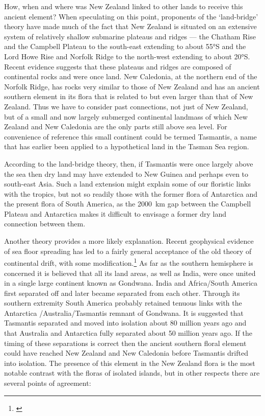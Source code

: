 How, when and where was New Zealand linked to other lands to receive this ancient element? When speculating on this point, proponents of the `land-bridge' theory have made much of the fact that New Zealand is situated on an extensive system of relatively shallow submarine plateaus and ridges --- the Chatham Rise and the Campbell Plateau to the south-east extending to about \ang{55}S and the Lord Howe Rise and Norfolk Ridge to the north-west extending to about \ang{20}S.
Recent evidence suggests that these plateaus and ridges are composed of continental rocks and were once land.
New Caledonia, at the northern end of the Norfolk Ridge, has rocks very similar to those of New Zealand and has an ancient southern element in its flora that is related to but even larger than that of New Zealand.
Thus we have to consider past connections, not just of New Zealand, but of a small and now largely submerged continental landmass of which New Zealand and New Caledonia are the only parts still above sea level.
For convenience of reference this small continent could be termed Tasmantis, a name that has earlier been applied to a hypothetical land in the Tasman Sea region.

According to the land-bridge theory, then, if Tasmantis were once largely above the sea then dry land may have extended to New Guinea and perhaps even to south-east Asia.
Such a land extension might explain some of our floristic links with the tropics, but not so readily those with the former flora of Antarctica and the present flora of South America, as the \SI{2000}{\kilo\metre} gap between the Campbell Plateau and Antarctica makes it difficult to envisage a former dry land connection between them.

Another theory provides a more likely explanation.
Recent geophysical evidence of sea floor spreading has led to a fairly general acceptance of the old theory of continental drift, with some modification.\footnote{\cite{stevens1980new}}
As far as the southern hemisphere is concerned it is believed that all its land areas, as well as India, were once united in a single large continent known as Gondwana.
India and Africa/South America first separated off and later became separated from each other.
Through its southern extremity South America probably retained tenuous links with the Antarctica /Australia/Tasmantis remnant of Gondwana.
It is suggested that Tasmantis separated and moved into isolation about 80 million years ago and that Australia and Antarctica fully separated about 50 million years ago.
If the timing of these separations is correct then the ancient southern floral element could have reached New Zealand and New Caledonia before Tasmantis drifted into isolation.
The presence of this element in the New Zealand flora is the most notable contrast with the floras of isolated islands, but in other respects there are several points of agreement:

